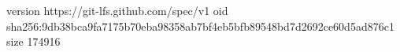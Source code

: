 version https://git-lfs.github.com/spec/v1
oid sha256:9db38bca9fa7175b70eba98358ab7bf4eb5bfb89548bd7d2692ce60d5ad876c1
size 174916
